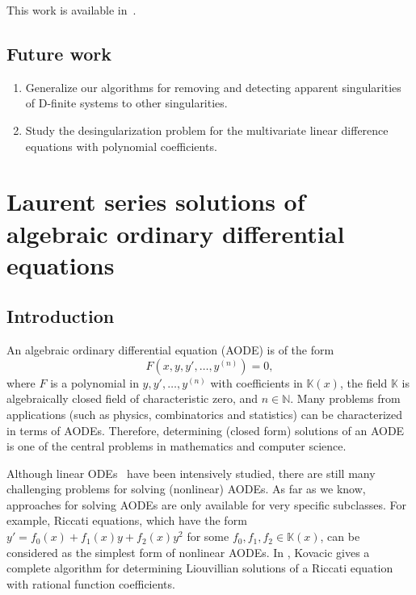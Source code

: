 \documentclass[10pt,a4paper]{article}
\newcommand{\bN}{ {\mathbb  N}}
\newcommand{\bK}{ {\mathbb  K}}
\begin{document}
This work is available in~\cite{Yi2017}.

\subsection{Future work}

\begin{enumerate}
 \item Generalize our algorithms for removing and detecting apparent singularities of D-finite systems to other singularities.
 \item Study the desingularization problem for the multivariate linear difference equations with polynomial coefficients. 
\end{enumerate}

\section{Laurent series solutions of algebraic ordinary differential equations} \label{SECT:Laurentsols}

\subsection{Introduction}

An algebraic ordinary differential equation (AODE) is of the form 
$$F(x,y,y',\ldots,y^{(n)})=0,$$ 
where $F$ is a polynomial in $y,y',\ldots,y^{(n)}$ with coefficients in $\mathbb{K}(x)$, the field $\bK$ is 
algebraically closed field of characteristic zero, and $n \in \bN$. 
Many problems from applications (such as physics, combinatorics and statistics) 
can be characterized in terms of AODEs.  
Therefore, determining (closed form) solutions of an AODE is one of the central problems in mathematics and computer science.
 
Although linear ODEs~\cite{Ince1926} have been intensively studied, there are still many challenging problems for solving
(nonlinear) AODEs. As far as we know, approaches for solving AODEs are only available for very specific subclasses. 
For example, Riccati equations, 
which have the form $y'=f_0(x)+f_1(x)y+f_2(x)y^2$ for some $f_0,f_1,f_2 \in \mathbb{K}(x)$, %
can be considered as the simplest form of nonlinear AODEs. 
In \cite{Kovacic}, Kovacic gives a complete algorithm for determining Liouvillian solutions of 
a Riccati equation with rational function coefficients. 
\end{document}
